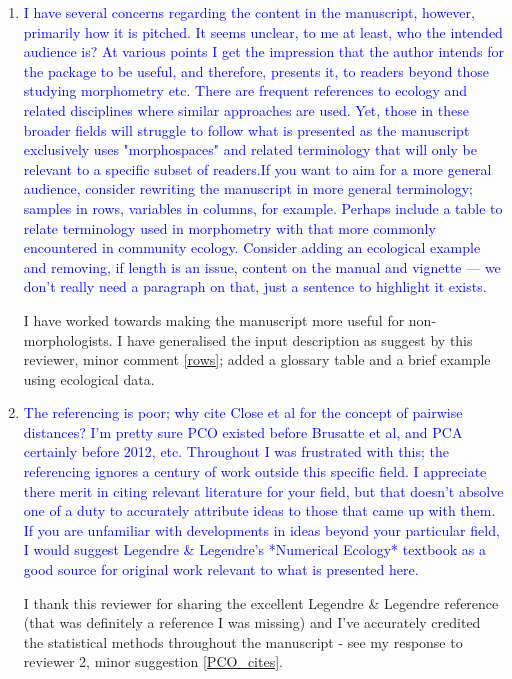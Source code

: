 \documentclass[12pt,letterpaper]{article}
\begin{document}
\begin{enumerate}

\item{\textcolor{blue}{I have several concerns regarding the content in the manuscript, however, primarily how it is pitched.
It seems unclear, to me at least, who the intended audience is?
At various points I get the impression that the author intends for the package to be useful, and therefore, presents it, to readers beyond those studying morphometry etc.
There are frequent references to ecology and related disciplines where similar approaches are used.
Yet, those in these broader fields will struggle to follow what is presented as the manuscript exclusively uses "morphospaces" and related terminology that will only be relevant to a specific subset of readers.If you want to aim for a more general audience, consider rewriting the manuscript in more general terminology; samples in rows, variables in columns, for example.
Perhaps include a table to relate terminology used in morphometry with that more commonly encountered in community ecology.
Consider adding an ecological example and removing, if length is an issue, content on the manual and vignette --- we don't really need a paragraph on that, just a sentence to highlight it exists.}}

I have worked towards making the manuscript more useful for non-morphologists.
I have generalised the input description as suggest by this reviewer, minor comment \ref{rows}; added a glossary table and a brief example using ecological data.

\item{\textcolor{blue}{The referencing is poor; why cite Close et al for the concept of pairwise distances?
I'm pretty sure PCO existed before Brusatte et al, and PCA certainly before 2012, etc.
Throughout I was frustrated with this; the referencing ignores a century of work outside this specific field.
I appreciate there merit in citing relevant literature for your field, but that doesn't absolve one of a duty to accurately attribute ideas to those that came up with them.
If you are unfamiliar with developments in ideas beyond your particular field, I would suggest Legendre \& Legendre's *Numerical Ecology* textbook as a good source for original work relevant to what is presented here.}}

I thank this reviewer for sharing the excellent Legendre \& Legendre reference (that was definitely a reference I was missing) and I've accurately credited the statistical methods throughout the manuscript - see my response to reviewer 2, minor suggestion \ref{PCO_cites}.


\end{enumerate}
\end{document}
